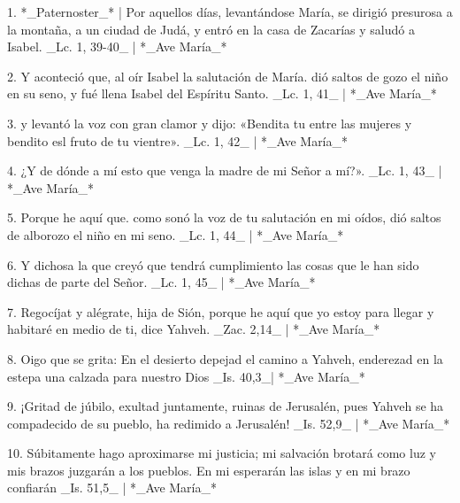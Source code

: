 1. *_Paternoster_* | Por aquellos días, levantándose María, se dirigió presurosa a la montaña, a un ciudad de Judá, y entró en la casa de Zacarías y saludó a Isabel. _Lc. 1, 39-40_ | *_Ave María_*

2. Y aconteció que, al oír Isabel la salutación de María. dió saltos de gozo el niño en su seno, y fué llena Isabel del Espíritu Santo. _Lc. 1, 41_ | *_Ave María_*

3. y levantó la voz con gran clamor y dijo: «Bendita tu entre las mujeres y bendito esl fruto de tu vientre». _Lc. 1, 42_ | *_Ave María_*

4. ¿Y de dónde a mí esto que venga la madre de mi Señor a mí?». _Lc. 1, 43_ | *_Ave María_*

5. Porque he aquí que. como sonó la voz de tu salutación en mi oídos, dió saltos de alborozo el niño en mi seno. _Lc. 1, 44_ | *_Ave María_*

6. Y dichosa la que creyó que tendrá cumplimiento las cosas que le han sido dichas de parte del Señor. _Lc. 1, 45_ | *_Ave María_*

7. Regocíjat y alégrate, hija de Sión, porque he aquí que yo estoy para llegar y habitaré en medio de ti, dice Yahveh. _Zac. 2,14_ | *_Ave María_*

8. Oigo que se grita: En el desierto depejad el camino a Yahveh, enderezad en la estepa una calzada para nuestro Dios _Is. 40,3_| *_Ave María_*

9. ¡Gritad de júbilo, exultad juntamente, ruinas de Jerusalén, pues Yahveh se ha compadecido de su pueblo, ha redimido a Jerusalén! _Is. 52,9_ | *_Ave María_*

10. Súbitamente hago aproximarse mi justicia; mi salvación brotará como luz y mis brazos juzgarán a los pueblos. En mi esperarán las islas y en mi brazo confiarán _Is. 51,5_ | *_Ave María_*